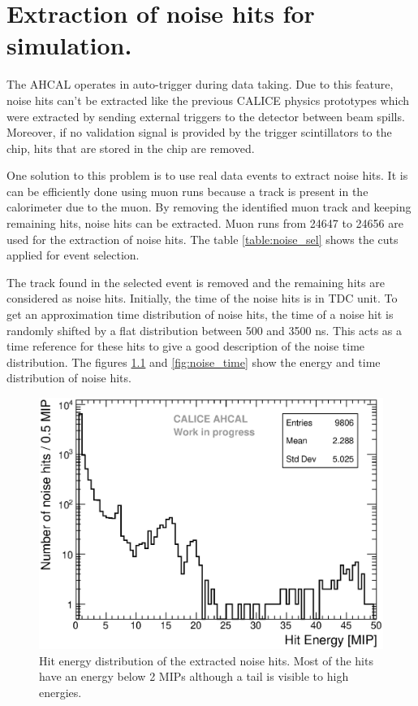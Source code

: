 \chapter{Extraction of noise hits for simulation.}
\label{appendix:noise}

The AHCAL operates in auto-trigger during data taking. Due to this feature, noise hits can't be extracted like the previous CALICE physics prototypes which were extracted by sending external triggers to the detector between beam spills. Moreover, if no validation signal is provided by the trigger scintillators to the chip, hits that are stored in the chip are removed.

One solution to this problem is to use real data events to extract noise hits. It is can be efficiently done using muon runs because a track is present in the calorimeter due to the muon. By removing the identified muon track and keeping remaining hits, noise hits can be extracted. Muon runs from 24647 to 24656 are used for the extraction of noise hits. The table \ref{table:noise_sel} shows the cuts applied for event selection.

The track found in the selected event is removed and the remaining hits are considered as noise hits. Initially, the time of the noise hits is in TDC unit. To get an approximation time distribution of noise hits, the time of a noise hit is randomly shifted by a flat distribution between 500 and 3500 ns. This acts as a time reference for these hits to give a good description of the noise time distribution. The figures \ref{fig:noise_energy} and \ref{fig:noise_time} show the energy and time distribution of noise hits.

\begin{figure}[htbp!]
	\centering
	\includegraphics[width=0.7\linewidth]{../Thesis_Plots/Timing/Muons/Plots/Noise_Energy_Flat.eps}
	\caption{Hit energy distribution of the extracted noise hits. Most of the hits have an energy below 2 MIPs although a tail is visible to high energies.} \label{fig:noise_energy}
\end{figure}


